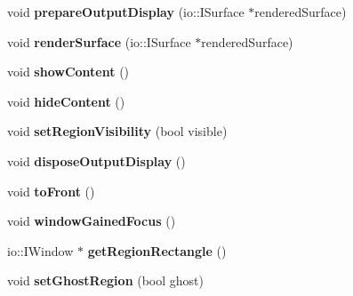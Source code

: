 \begin{CompactItemize}
\item 
void \textbf{prepareOutputDisplay} (io::ISurface $\ast$renderedSurface)\label{classbr_1_1pucrio_1_1telemidia_1_1ginga_1_1ncl_1_1model_1_1presentation_1_1FormatterRegion_dd006fae2875207823eb7d38b277bdb1}

\item 
void \textbf{renderSurface} (io::ISurface $\ast$renderedSurface)\label{classbr_1_1pucrio_1_1telemidia_1_1ginga_1_1ncl_1_1model_1_1presentation_1_1FormatterRegion_9aac7b1fd74303a1efc792d9d1a87def}

\item 
void \textbf{showContent} ()\label{classbr_1_1pucrio_1_1telemidia_1_1ginga_1_1ncl_1_1model_1_1presentation_1_1FormatterRegion_4c23683d14432a0807b6c360c8b58e21}

\item 
void \textbf{hideContent} ()\label{classbr_1_1pucrio_1_1telemidia_1_1ginga_1_1ncl_1_1model_1_1presentation_1_1FormatterRegion_d0f9fc66cd29a405bd088ab0632270a2}

\item 
void \textbf{setRegionVisibility} (bool visible)\label{classbr_1_1pucrio_1_1telemidia_1_1ginga_1_1ncl_1_1model_1_1presentation_1_1FormatterRegion_94bc9d56d9b12e3340c6c2dbf0deae9c}

\item 
void \textbf{disposeOutputDisplay} ()\label{classbr_1_1pucrio_1_1telemidia_1_1ginga_1_1ncl_1_1model_1_1presentation_1_1FormatterRegion_6783add36f88b7281c19ec1dd1d49a90}

\item 
void \textbf{toFront} ()\label{classbr_1_1pucrio_1_1telemidia_1_1ginga_1_1ncl_1_1model_1_1presentation_1_1FormatterRegion_48a9c646659814220ac869bbcb60b52c}

\item 
void \textbf{windowGainedFocus} ()\label{classbr_1_1pucrio_1_1telemidia_1_1ginga_1_1ncl_1_1model_1_1presentation_1_1FormatterRegion_4ac126e1951af33fda2168992874f8e7}

\item 
io::IWindow $\ast$ \textbf{getRegionRectangle} ()\label{classbr_1_1pucrio_1_1telemidia_1_1ginga_1_1ncl_1_1model_1_1presentation_1_1FormatterRegion_0523a307edb8e45039639f9347cd36ab}

\item 
void \textbf{setGhostRegion} (bool ghost)\label{classbr_1_1pucrio_1_1telemidia_1_1ginga_1_1ncl_1_1model_1_1presentation_1_1FormatterRegion_35bda190672be3b7101c12728c5c3de8}


\end{CompactItemize}
